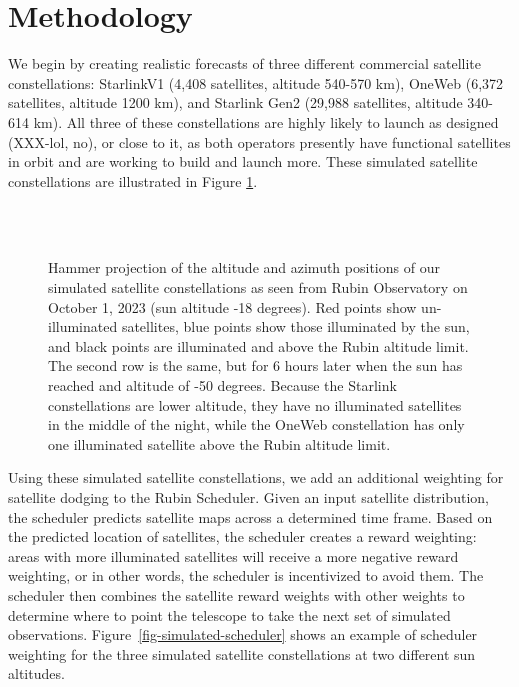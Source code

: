 \documentclass[linenumbers]{aastex631}
\begin{document}
\section{Methodology}
We begin by creating realistic forecasts of three different commercial satellite constellations: StarlinkV1 (4,408 satellites, altitude 540-570 km), OneWeb (6,372 satellites, altitude 1200 km), and Starlink Gen2 (29,988 satellites, altitude 340-614 km). All three of these constellations are highly likely to launch as designed (XXX-lol, no), or close to it, as both operators presently have functional satellites in orbit and are working to build and launch more. These simulated satellite constellations are illustrated in Figure \ref{fig-simulated-constellations}.

\begin{figure}[ht!]
\\
\\
\caption{Hammer projection of the altitude and azimuth positions of our simulated satellite constellations as seen from Rubin Observatory on October 1, 2023 (sun altitude -18 degrees). Red points show un-illuminated satellites, blue points show those illuminated by the sun, and black points are illuminated and above the Rubin altitude limit. The second row is the same, but for 6 hours later when the sun has reached and altitude of -50 degrees. Because the Starlink constellations are lower altitude, they have no illuminated satellites in the middle of the night, while the OneWeb constellation has only one illuminated satellite above the Rubin altitude limit. \label{fig-simulated-constellations} }
\end{figure}

Using these simulated satellite constellations, we add an additional weighting for satellite dodging to the Rubin Scheduler. Given an input satellite distribution, the scheduler predicts satellite maps across a determined time frame. Based on the predicted location of satellites, the scheduler creates a reward weighting: areas with more illuminated satellites will receive a more negative reward weighting, or in other words, the scheduler is incentivized to avoid them. The scheduler then combines the satellite reward weights with other weights to determine where to point the telescope to take the next set of simulated observations. Figure~\ref{fig-simulated-scheduler} shows an example of scheduler weighting for the three simulated satellite constellations at two different sun altitudes.
\end{document}
